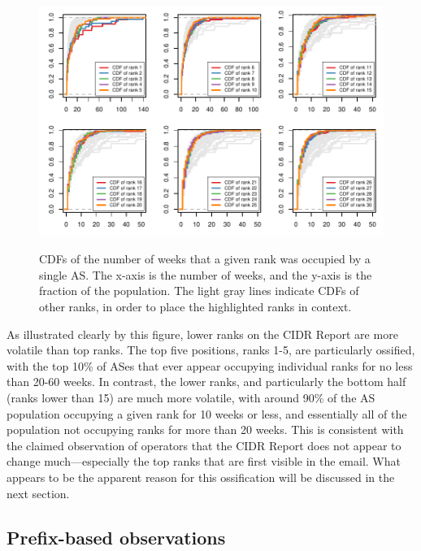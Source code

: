 \begin{figure}[h!]
\begin{centering}
\begin{singlespace}
    \includegraphics[width=6in]{figures/cr_rank_cdfs.pdf}
    \vspace{-2em}\\
    \caption{CDFs of the number of weeks that a given rank was occupied by a
    single AS. The x-axis is the number of weeks, and the y-axis is the
    fraction of the population. The light gray lines indicate CDFs of other
    ranks, in order to place the highlighted ranks in context.}
    \label{fig:rank_cdfs}
\end{singlespace}
\end{centering}
\end{figure}

As illustrated clearly by this figure, lower ranks on the CIDR Report are more
volatile than top ranks. The top five positions, ranks 1-5, are particularly
ossified, with the top 10\% of ASes that ever appear occupying individual ranks
for no less than 20-60 weeks. In contrast, the lower ranks, and particularly
the bottom half (ranks lower than 15) are much more volatile, with around
90\% of the AS population occupying a given rank for 10 weeks or less, and
essentially all of the population not occupying ranks for more than 20
weeks. This is consistent with the claimed observation of operators that
the CIDR Report does not appear to change much---especially the top ranks
that are first visible in the email. What appears to be the apparent reason
for this ossification will be discussed in the next section.

\subsection{Prefix-based observations}

